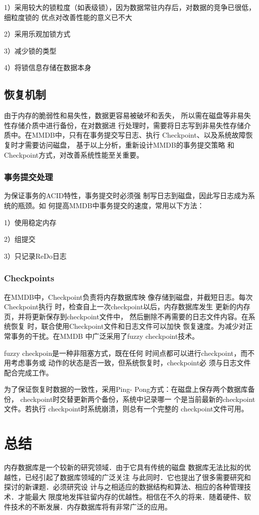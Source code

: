 \documentclass[literaturereview]{zjutreport}
\begin{document}
1）采用较大的锁粒度（如表级锁），因为数据常驻内存后，对数据的竞争已很低，细粒度锁的
优点对改善性能的意义已不大

2）采用乐观加锁方式

3）减少锁的类型

4）将锁信息存储在数据本身

\section{恢复机制}
由于内存的脆弱性和易失性，数据更容易被破坏和丢失，
所以需在磁盘等非易失性存储介质中进行备份，在对数据进
行处理时，需要将日志写到非易失性存储介质中。在MMDB中，只有在事务提交写日志、执行
Checkpoint、以及系统故障恢复时才需要访问磁盘，
基于以上分析，重新设计MMDB的事务提交策略
和Checkpoint方式，对改善系统性能至关重要。

\subsection{事务提交处理}
为保证事务的ACID特性，事务提交时必须强
制写日志到磁盘，因此写日志成为系统的瓶颈。如
何提高MMDB中事务提交的速度，常用以下方法：

1）使用稳定内存

2）组提交

3）只记录ReDo日志

\subsection{Checkpoints}
在MMDB中，Checkpoint负责将内存数据库映
像存储到磁盘，并截短日志。每次Checkpoint执行
时，检查自上一次checkpoint以后，内存数据库发生
更新的内存页，并将更新保存到checkpoint文件中，
然后删除不再需要的日志文件内容。在系统恢复
时，联合使用Checkpoint文件和日志文件可以加快
恢复速度。为减少对正常事务的干扰。在MMDB
中广泛采用了fuzzy checkpoint技术。

fuzzy checkpoin是一种非阻塞方式，既在任何
时间点都可以进行checkpoint，而不用考虑事务或
动作的状态是否一致，但系统恢复时，checkpoint必
须与日志文件配合完成工作。

为了保证恢复时数据的一致性，采用Ping-
Pong方式：在磁盘上保存两个数据库备份，
checkpoint时交替更新两个备份，系统中记录哪一
个是当前最新的checkpoint文件。若执行
checkpoint时系统崩溃，则总有一个完整的
checkpoint文件可用。

\chapter{总结}
内存数据库是一个较新的研究领域．由于它具有传统的磁盘
数据库无法比拟的优越性，已经引起了数据库领域的广泛关注
与此同时．它也提出了很多需要研究和探讨的新课题．必须研究设
计与之相适应的数据结构和算法、相应的各种管理技术．才能最大
限度地发挥驻留内存的优越性。相信在不久的将来．随着硬件、软
件技术的不断发展．内存数据库将有非常广泛的应用。

\backmatter
\endgroup %
\clearpage %

\nocite{*}                                   %

\end{document}
